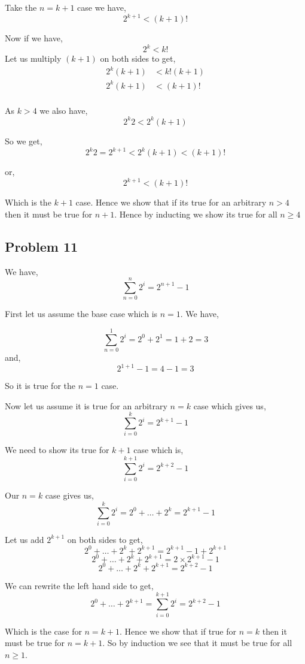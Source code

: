 \documentclass[a4paper]{report}
\begin{document}
Take the $n = k + 1$ case we have, 
$$ 2^{k + 1} < (k + 1)! $$ 

Now if we have, 
$$ 2^{k} < k! $$ 
Let us multiply $(k + 1)$ on both sides to get,  
\begin{align*}
    2^{k} (k + 1) &< k! (k + 1) \\
    2^{k} (k + 1) &< (k+ 1)!\\
\end{align*}

As $k > 4$ we also have, 
$$ 2^{k} 2 < 2^{k} (k + 1) $$ 

So we get, 
$$ 2^{k} 2 = 2^{k + 1} < 2^{k} (k + 1) < (k + 1)!$$ 

or, 
$$ 2^{k + 1} < (k + 1)! $$ 

Which is the $k + 1$ case. Hence we show that if its true for an arbitrary  $n > 4$ then it must be true for $n + 1$. Hence by inducting we show its true for all $n \ge 4$
\subsection*{Problem 11}
We have, 
$$ \sum_{n=0}^{n} 2^{i}= 2^{n + 1} - 1 $$ 

First let us assume the base case which is $n = 1$. We have, 

$$ \sum_{n=0}^{1} 2^{i} = 2^{0} + 2^{1} = 1 + 2 = 3 $$
and, 
$$ 2^{1 + 1} - 1= 4 - 1= 3 $$ 

So it is true for the $n = 1$ case.

Now let us assume it is true for an arbitrary $n = k$ case which gives us, 
$$ \sum_{i=0}^{k} 2^{i} = 2^{k + 1} - 1 $$ 

We need to show its true for $k + 1$  case which is, 
$$ \sum_{i=0}^{k + 1} 2^{i} = 2^{k + 2} - 1 $$ 

Our $n = k$ case gives us, 
$$ \sum_{i=0}^{k} 2^{i} = 2^{0} + \dots + 2^{k} = 2^{k + 1} - 1$$

Let us add $2^{k + 1}$ on both sides to get, 
$$  2^{0} + \dots + 2^{k} + 2^{k + 1} = 2^{k + 1} - 1 + 2^{k + 1}$$
$$  2^{0} + \dots + 2^{k} + 2^{k + 1} = 2 \times  2^{k + 1} - 1 $$
$$  2^{0} + \dots + 2^{k} + 2^{k + 1} =  2^{k + 2} - 1 $$

We can rewrite the left hand side to get,
$$  2^{0} + \dots + 2^{k + 1} = \sum_{i = 0}^{k + 1} 2^{i} = 2^{k + 2} - 1 $$ 

Which is the case for $n = k + 1$. Hence we show that if true for $n = k$ then it must be true for $n = k + 1$. So by induction we see that it must be true for all  $n \ge 1$.
$$  $$ 
\end{document}

